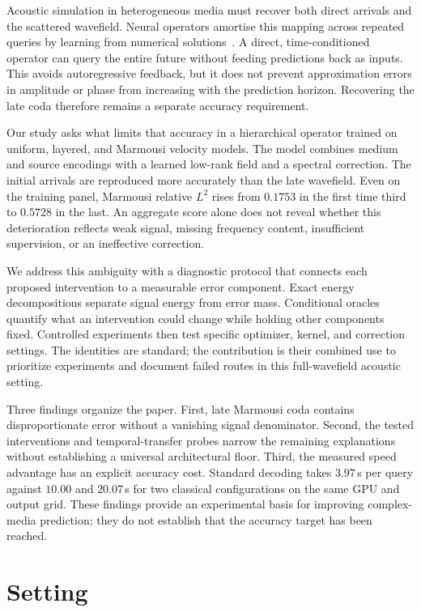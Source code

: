 \documentclass[11pt,a4paper]{article}
\begin{document}
Acoustic simulation in heterogeneous media must recover both direct arrivals and the scattered
wavefield. Neural operators amortise this mapping across repeated queries by learning from
numerical solutions~\cite{fno}. A direct, time-conditioned operator can query the entire future
without feeding predictions back as inputs. This avoids autoregressive feedback, but it does
not prevent approximation errors in amplitude or phase from increasing with the prediction
horizon. Recovering the late coda therefore remains a separate accuracy requirement.

Our study asks what limits that accuracy in a hierarchical operator trained on uniform,
layered, and Marmousi velocity models. The model combines medium and source encodings with
a learned low-rank field and a spectral correction. The initial arrivals are reproduced more
accurately than the late wavefield. Even on the training panel, Marmousi relative $L^2$ rises
from $0.1753$ in the first time third to $0.5728$ in the last. An aggregate score alone does
not reveal whether this deterioration reflects weak signal, missing frequency content,
insufficient supervision, or an ineffective correction.

We address this ambiguity with a diagnostic protocol that connects each proposed intervention
to a measurable error component. Exact energy decompositions separate signal energy from
error mass. Conditional oracles quantify what an intervention could change while holding
other components fixed. Controlled experiments then test specific optimizer, kernel, and
correction settings. The identities are standard; the contribution is their combined use to
prioritize experiments and document failed routes in this full-wavefield acoustic setting.

Three findings organize the paper. First, late Marmousi coda contains disproportionate error
without a vanishing signal denominator. Second, the tested interventions and temporal-transfer
probes narrow the remaining explanations without establishing a universal architectural floor.
Third, the measured speed advantage has an explicit accuracy cost. Standard decoding takes
$3.97$\,s per query against $10.00$ and $20.07$\,s for two classical configurations on the same
GPU and output grid. These findings provide an experimental basis for improving complex-media
prediction; they do not establish that the accuracy target has been reached.


\section{Setting}
\end{document}
